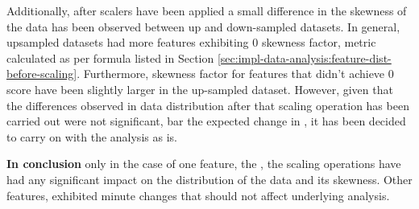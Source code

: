 Additionally, after scalers have been applied a small difference in the skewness of the data has been observed between up and down-sampled datasets. In general, upsampled datasets had more features exhibiting 0 skewness factor, metric calculated as per formula listed in Section \ref{sec:impl-data-analysis:feature-dist-before-scaling}. Furthermore, skewness factor for features that didn't achieve 0 score have been slightly larger in the up-sampled dataset. 
However, given that the differences observed in data distribution after that scaling operation has been carried out were not significant, bar the expected change in \fileAgeInSec{}, it has been decided to carry on with the analysis as is.

\textbf{In conclusion} only in the case of one feature, the \fileAgeInSec{}, the scaling operations have had any significant impact on the distribution of the data and its skewness. Other features, exhibited minute changes that should not affect underlying analysis.
\FloatBarrier